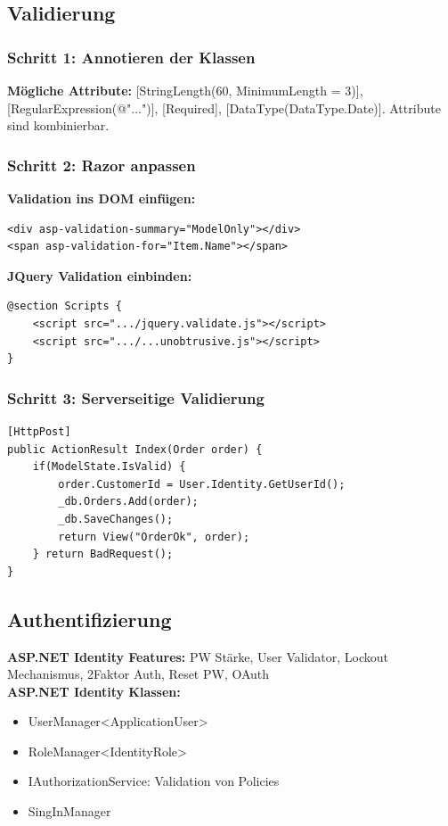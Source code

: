 \subsection{Validierung}
\subsubsection{Schritt 1: Annotieren der Klassen}
\textbf{Mögliche Attribute:} [StringLength(60, MinimumLength = 3)], [RegularExpression(@"...")], [Required], [DataType(DataType.Date)].
Attribute sind kombinierbar.
\subsubsection{Schritt 2: Razor anpassen}
\textbf{Validation ins DOM einfügen:}
\begin{lstlisting}
<div asp-validation-summary="ModelOnly"></div>
<span asp-validation-for="Item.Name"></span>
\end{lstlisting}
\textbf{JQuery Validation einbinden:}
\begin{lstlisting}
@section Scripts {
    <script src=".../jquery.validate.js"></script>
    <script src=".../...unobtrusive.js"></script>
}
\end{lstlisting}

\subsubsection{Schritt 3: Serverseitige Validierung}
\begin{lstlisting}
[HttpPost]
public ActionResult Index(Order order) {
    if(ModelState.IsValid) {
        order.CustomerId = User.Identity.GetUserId();
        _db.Orders.Add(order);
        _db.SaveChanges();
        return View("OrderOk", order);
    } return BadRequest();
}
\end{lstlisting}

\subsection{Authentifizierung}
\textbf{ASP.NET Identity Features:} PW Stärke, User Validator, Lockout Mechanismus, 2Faktor Auth, Reset PW, OAuth\\
\textbf{ASP.NET Identity Klassen:}
\begin{itemize}
    \item UserManager<ApplicationUser>
    \item RoleManager<IdentityRole>
    \item IAuthorizationService: Validation von Policies
    \item SingInManager
\end{itemize}

